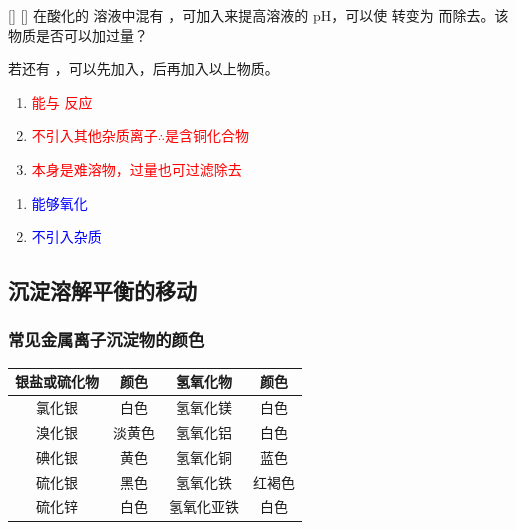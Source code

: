             \begin{xmp}
                [分离除杂应用]
                {}
                []
                []
                在酸化的  溶液中混有 ，可加入\uline{}来提高溶液的 pH，可以使 转变为  而除去。该物质是否可以加过量？

                若还有 ，可以先加入\uline{}，后再加入以上物质。

                \begin{enumerate}
                    \item \textcolor{red}{能与  反应}
                    \item \textcolor{red}{不引入其他杂质离子\quad \(\therefore\)是含铜化合物}
                    \item \textcolor{red}{本身是难溶物，过量也可过滤除去}
                \end{enumerate}
                \begin{enumerate}
                    \item \textcolor{blue}{能够氧化 }
                    \item \textcolor{blue}{不引入杂质}
                \end{enumerate}
            \end{xmp}

    \subsection{沉淀溶解平衡的移动}\label{subsec:沉淀溶解平衡的移动}

        \subsubsection{常见金属离子沉淀物的颜色}\label{subsubsec:常见金属离子沉淀物的颜色}

            \begin{center}
            \small
            \begin{tabular}{|c|c|c|c|}
                \hline
                银盐或硫化物 & 颜色 & 氢氧化物 & 颜色 \\
                \hline
                氯化银 & 白色 & 氢氧化镁 & 白色 \\
                \hline
                溴化银 & 淡黄色 & 氢氧化铝 & 白色 \\
                \hline
                碘化银 & 黄色 & 氢氧化铜 & 蓝色 \\
                \hline
                硫化银 & 黑色 & 氢氧化铁 & 红褐色 \\
                \hline
                硫化锌 & 白色 & 氢氧化亚铁 & 白色 \\
                \hline
            \end{tabular}
            \end{center}

